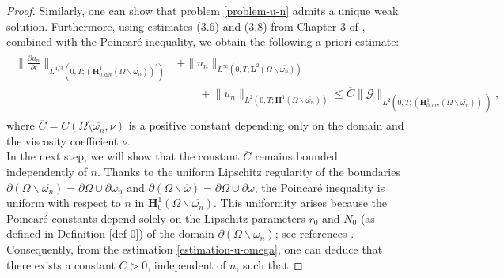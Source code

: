 \documentclass[a4paper,12pt,reqno,natbib]{amsart}
\def\H{\textbf{H}}
\def\L{\textbf{L}}
\begin{document}
\begin{proof}
\noindent Similarly, one can show that problem \eqref{problem-u-n} admits a unique weak solution. Furthermore, using estimates (3.6) and (3.8) from Chapter 3 of \cite{pokorny2022navier}, combined with the Poincaré inequality, we obtain the following a priori estimate:
\begin{align}\label{estimation-u-omega}
\begin{split}
\big\|\frac{\partial u_n}{\partial t}\big\|_{L^{4/3}(0,T;(\H^1_{0,\text{div}}(\Omega\backslash\overline{\omega_n}))^\prime)}&+\big\|u_n\big\|_{L^\infty(0,T;\L^2(\Omega\backslash\overline{\omega_n}))}\\
&\qquad+\big\|u_n\big\|_{ L^2(0,T;\H^1(\Omega\backslash\overline{\omega_n}))}\leq
\overline{C} \big\|\mathcal{G}\big\|_{L^2(0,T;(\H^1_{0,\text{div}}(\Omega\backslash\overline{\omega_n}))^\prime)},
\end{split}
\end{align}
where \( \overline{C} = C(\Omega \setminus \overline{\omega_n}, \nu) \) is a positive constant depending only on the domain and the viscosity coefficient \( \nu \).\\

\noindent In the next step, we will show that the constant \( \overline{C} \) remains bounded independently of \( n \). Thanks to the uniform Lipschitz regularity of the boundaries $\partial\left(\Omega \backslash \overline{\omega_n}\right)=\partial\Omega\cup\partial\omega_n$ and $\partial(\Omega \backslash \overline{\omega})=\partial\Omega\cup\partial\omega$, the Poincaré inequality is uniform with respect to $n$ in $\H^1_0\left(\Omega \backslash \overline{\omega_n}\right)$. This uniformity arises because the Poincaré constants depend solely on the Lipschitz parameters $r_0$ and $N_0$ (as defined in Definition \ref{def-0}) of the domain $\partial\left(\Omega \backslash \overline{\omega_n}\right)$; see references \cite{HenrotBook2006}. Consequently, from the estimation \eqref{estimation-u-omega}, one can deduce that there exists a constant $C>0$, independent of $n$, such that


\end{proof}
\end{document}
